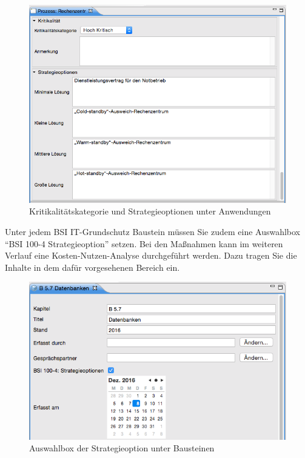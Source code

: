 \documentclass[a4paper,10pt]{book}
\begin{document}
\begin{figure}[htb!]
  \centering
  \includegraphics[width=\linewidth]{Screenshot/kritikalitaetskategorie-und-strategieoptionen-unter-anwendungen.png}
  \caption{Kritikalitätskategorie und Strategieoptionen unter Anwendungen}
  \label{fig:kritikalitaetskategorie-und-strategieoptionen-unter-anwendungen}
\end{figure}

Unter jedem BSI IT-Grundschutz Baustein müssen Sie zudem eine Auswahlbox "`BSI
100-4 Strategieoption"' setzen. Bei den Maßnahmen kann im weiteren Verlauf eine
Kosten-Nutzen-Analyse durchgeführt werden. Dazu tragen Sie die Inhalte in dem
dafür vorgesehenen Bereich ein.

\begin{figure}[htb!]
  \centering
  \includegraphics[width=\linewidth]{Screenshot/auswahlbox-der-strategieoption-unter-bausteinen.png}
  \caption{Auswahlbox der Strategieoption unter Bausteinen}
  \label{fig:auswahlbox-der-strategieoption-unter-bausteinen}
\end{figure}
\end{document}

